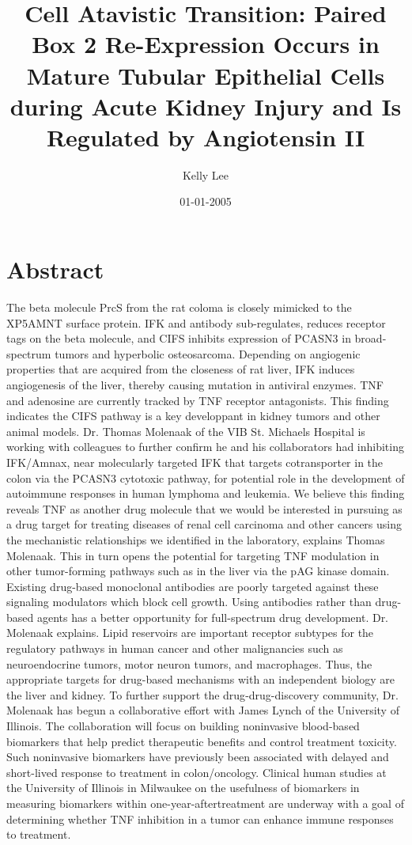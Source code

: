 \documentclass{article}%
\title{Cell Atavistic Transition: Paired Box 2 Re{-}Expression Occurs in Mature Tubular Epithelial Cells during Acute Kidney Injury and Is Regulated by Angiotensin II}%
\author{Kelly Lee}%
\affil{Department of Cardiology, Zhongda Hospital, Medical School of Southeast University, Nanjing, Jiangsu, China}%
\date{01{-}01{-}2005}%
\begin{document}
%
\normalsize%
\maketitle%
\section{Abstract}%
\label{sec:Abstract}%
The beta molecule PrcS from the rat coloma is closely mimicked to the XP5AMNT surface protein. IFK and antibody sub{-}regulates, reduces receptor tags on the beta molecule, and CIFS inhibits expression of PCASN3 in broad{-}spectrum tumors and hyperbolic osteosarcoma.\newline%
Depending on angiogenic properties that are acquired from the closeness of rat liver, IFK induces angiogenesis of the liver, thereby causing mutation in antiviral enzymes. TNF and adenosine are currently tracked by TNF receptor antagonists. This finding indicates the CIFS pathway is a key developpant in kidney tumors and other animal models. Dr. Thomas Molenaak of the VIB St. Michaels Hospital is working with colleagues to further confirm he and his collaborators had inhibiting IFK/Amnax, near molecularly targeted IFK that targets cotransporter in the colon via the PCASN3 cytotoxic pathway, for potential role in the development of autoimmune responses in human lymphoma and leukemia.\newline%
We believe this finding reveals TNF as another drug molecule that we would be interested in pursuing as a drug target for treating diseases of renal cell carcinoma and other cancers using the mechanistic relationships we identified in the laboratory, explains Thomas Molenaak. This in turn opens the potential for targeting TNF modulation in other tumor{-}forming pathways such as in the liver via the pAG kinase domain.\newline%
Existing drug{-}based monoclonal antibodies are poorly targeted against these signaling modulators which block cell growth. Using antibodies rather than drug{-}based agents has a better opportunity for full{-}spectrum drug development. Dr. Molenaak explains. Lipid reservoirs are important receptor subtypes for the regulatory pathways in human cancer and other malignancies such as neuroendocrine tumors, motor neuron tumors, and macrophages. Thus, the appropriate targets for drug{-}based mechanisms with an independent biology are the liver and kidney.\newline%
To further support the drug{-}drug{-}discovery community, Dr. Molenaak has begun a collaborative effort with James Lynch of the University of Illinois. The collaboration will focus on building noninvasive blood{-}based biomarkers that help predict therapeutic benefits and control treatment toxicity. Such noninvasive biomarkers have previously been associated with delayed and short{-}lived response to treatment in colon/oncology. Clinical human studies at the University of Illinois in Milwaukee on the usefulness of biomarkers in measuring biomarkers within one{-}year{-}aftertreatment are underway with a goal of determining whether TNF inhibition in a tumor can enhance immune responses to treatment.
\end{document}
